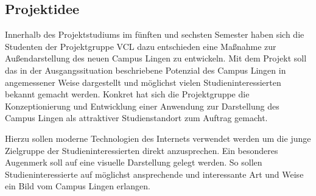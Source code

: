 \subsection{Projektidee}
\label{sec:Projektidee}

Innerhalb des Projektstudiums im fünften und sechsten Semester haben sich die
Studenten der Projektgruppe \acs{VCL} dazu entschieden eine
Maßnahme zur Außendarstellung des neuen Campus Lingen zu entwickeln. Mit dem
Projekt soll das in der Ausgangssituation beschriebene Potenzial des Campus
Lingen in angemessener Weise dargestellt und möglichst vielen
Studieninteressierten bekannt gemacht werden. Konkret hat sich die Projektgruppe
die Konzeptionierung und Entwicklung einer Anwendung zur Darstellung
des Campus Lingen als attraktiver Studienstandort zum Auftrag gemacht. 

Hierzu sollen moderne Technologien des Internets verwendet werden um die junge
Zielgruppe der Studieninteressierten direkt anzusprechen. Ein besonderes
Augenmerk soll auf eine visuelle Darstellung gelegt werden. So sollen
Studieninteressierte auf möglichst ansprechende und interessante Art und Weise
ein Bild vom Campus Lingen erlangen.
